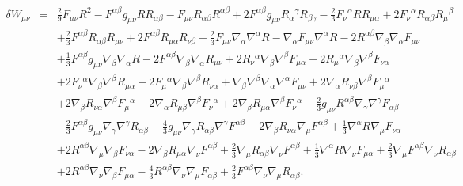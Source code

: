 \documentclass[10pt,letterpaper]{article}
\numberwithin{equation}{section}
\begin{document}
\begin{eqnarray}
\delta W_{\mu\nu}&=& \tfrac{2}{9} F_{\mu \nu } R^2 -  F^{\alpha \beta } g_{\mu \nu } R R_{\alpha \beta } -  F_{\mu \nu } R_{\alpha \beta } R^{\alpha \beta } + 2 F^{\alpha \beta } g_{\mu \nu } R_{\alpha }{}^{\gamma } R_{\beta \gamma } -  \tfrac{2}{3} F_{\nu }{}^{\alpha } R R_{\mu \alpha } + 2 F_{\nu }{}^{\alpha } R_{\alpha \beta } R_{\mu }{}^{\beta } \nonumber \\ 
&& + \tfrac{2}{3} F^{\alpha \beta } R_{\alpha \beta } R_{\mu \nu } + 2 F^{\alpha \beta } R_{\mu \alpha } R_{\nu \beta } -  \tfrac{2}{3} F_{\mu \nu } \nabla_{\alpha }\nabla^{\alpha }R -  \nabla_{\alpha }F_{\mu \nu } \nabla^{\alpha }R - 2 R^{\alpha \beta } \nabla_{\beta }\nabla_{\alpha }F_{\mu \nu } \nonumber \\ 
&& + \tfrac{1}{3} F^{\alpha \beta } g_{\mu \nu } \nabla_{\beta }\nabla_{\alpha }R - 2 F^{\alpha \beta } \nabla_{\beta }\nabla_{\alpha }R_{\mu \nu } + 2 R_{\nu }{}^{\alpha } \nabla_{\beta }\nabla^{\beta }F_{\mu \alpha } + 2 R_{\mu }{}^{\alpha } \nabla_{\beta }\nabla^{\beta }F_{\nu \alpha } \nonumber \\ 
&& + 2 F_{\nu }{}^{\alpha } \nabla_{\beta }\nabla^{\beta }R_{\mu \alpha } + 2 F_{\mu }{}^{\alpha } \nabla_{\beta }\nabla^{\beta }R_{\nu \alpha } + \nabla_{\beta }\nabla^{\beta }\nabla_{\alpha }\nabla^{\alpha }F_{\mu \nu } + 2 \nabla_{\alpha }R_{\nu \beta } \nabla^{\beta }F_{\mu }{}^{\alpha } \nonumber \\ 
&& + 2 \nabla_{\beta }R_{\nu \alpha } \nabla^{\beta }F_{\mu }{}^{\alpha } + 2 \nabla_{\alpha }R_{\mu \beta } \nabla^{\beta }F_{\nu }{}^{\alpha } + 2 \nabla_{\beta }R_{\mu \alpha } \nabla^{\beta }F_{\nu }{}^{\alpha } -  \tfrac{2}{3} g_{\mu \nu } R^{\alpha \beta } \nabla_{\gamma }\nabla^{\gamma }F_{\alpha \beta } \nonumber \\ 
&& -  \tfrac{2}{3} F^{\alpha \beta } g_{\mu \nu } \nabla_{\gamma }\nabla^{\gamma }R_{\alpha \beta } -  \tfrac{4}{3} g_{\mu \nu } \nabla_{\gamma }R_{\alpha \beta } \nabla^{\gamma }F^{\alpha \beta } - 2 \nabla_{\beta }R_{\nu \alpha } \nabla_{\mu }F^{\alpha \beta } + \tfrac{1}{3} \nabla^{\alpha }R \nabla_{\mu }F_{\nu \alpha } \nonumber \\ 
&& + 2 R^{\alpha \beta } \nabla_{\mu }\nabla_{\beta }F_{\nu \alpha } - 2 \nabla_{\beta }R_{\mu \alpha } \nabla_{\nu }F^{\alpha \beta } + \tfrac{2}{3} \nabla_{\mu }R_{\alpha \beta } \nabla_{\nu }F^{\alpha \beta } + \tfrac{1}{3} \nabla^{\alpha }R \nabla_{\nu }F_{\mu \alpha } + \tfrac{2}{3} \nabla_{\mu }F^{\alpha \beta } \nabla_{\nu }R_{\alpha \beta } \nonumber \\ 
&& + 2 R^{\alpha \beta } \nabla_{\nu }\nabla_{\beta }F_{\mu \alpha } -  \tfrac{4}{3} R^{\alpha \beta } \nabla_{\nu }\nabla_{\mu }F_{\alpha \beta } + \tfrac{2}{3} F^{\alpha \beta } \nabla_{\nu }\nabla_{\mu }R_{\alpha \beta }.
\label{dwtensor}
\end{eqnarray}
\end{document}
